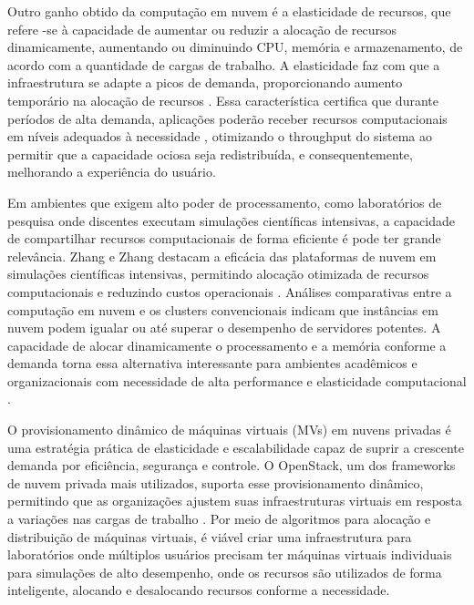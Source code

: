 Outro ganho obtido da computação em nuvem é a elasticidade de recursos, que refere -se à capacidade de aumentar ou reduzir a alocação de recursos dinamicamente, aumentando ou diminuindo CPU, memória e armazenamento, de acordo com a quantidade de cargas de trabalho. A elasticidade faz com que a infraestrutura se adapte a picos de demanda, proporcionando aumento temporário na alocação de recursos \cite{armbrust2010}. Essa característica certifica que durante períodos de alta demanda, aplicações poderão receber recursos computacionais em níveis adequados à necessidade \cite{oliveira2015}, otimizando o throughput do sistema ao permitir que a capacidade ociosa seja redistribuída, e consequentemente, melhorando a experiência do usuário.

Em ambientes que exigem alto poder de processamento, como laboratórios de pesquisa onde discentes executam simulações científicas intensivas, a capacidade de compartilhar recursos computacionais de forma eficiente é pode ter grande relevância. Zhang e Zhang destacam a eficácia das plataformas de nuvem em simulações científicas intensivas, permitindo alocação otimizada de recursos computacionais e reduzindo custos operacionais \cite{xu2021}. Análises comparativas entre a computação em nuvem e os clusters convencionais indicam que instâncias em nuvem podem igualar ou até superar o desempenho de servidores potentes. A capacidade de alocar dinamicamente o processamento e a memória conforme a demanda torna essa alternativa interessante para ambientes acadêmicos e organizacionais com necessidade de alta performance e elasticidade computacional \cite{roloff2012}. 

O provisionamento dinâmico de máquinas virtuais (MVs) em nuvens privadas é uma estratégia prática de elasticidade e escalabilidade capaz de suprir a crescente demanda por eficiência, segurança e controle. O OpenStack, um dos frameworks de nuvem privada mais utilizados, suporta esse provisionamento dinâmico, permitindo que as organizações ajustem suas infraestruturas virtuais em resposta a variações nas cargas de trabalho \cite{callegati2016}. Por meio de algoritmos para alocação e distribuição de máquinas virtuais, é viável criar uma infraestrutura para laboratórios onde múltiplos usuários precisam ter máquinas virtuais individuais para simulações de alto desempenho, onde os recursos são utilizados de forma inteligente, alocando e desalocando recursos conforme a necessidade.

